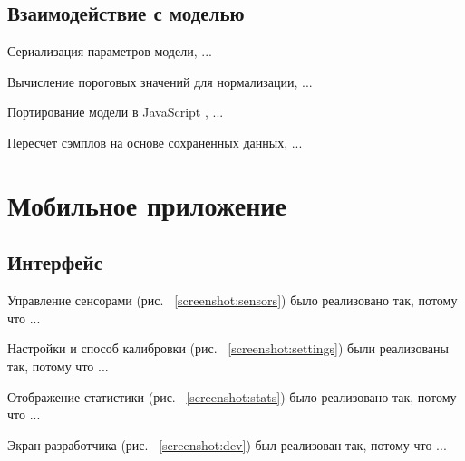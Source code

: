 \documentclass[14pt]{matmex-diploma-custom}
\begin{document}
\subsection{Взаимодействие с моделью}
Сериализация параметров модели, ...

Вычисление пороговых значений для нормализации, ...

Портирование модели в JavaScript \cite{library:sklearn_porter}, ...

Пересчет сэмплов на основе сохраненных данных, ...

\section{Мобильное приложение}
\subsection{Интерфейс}
Управление сенсорами (рис. ~\ref{screenshot:sensors}) было реализовано так,
потому что ...

Настройки и способ калибровки (рис. ~\ref{screenshot:settings}) были реализованы
так, потому что ...

Отображение статистики (рис. ~\ref{screenshot:stats}) было реализовано так,
потому что ...

Экран разработчика (рис. ~\ref{screenshot:dev}) был реализован так, потому что
...
\end{document}
